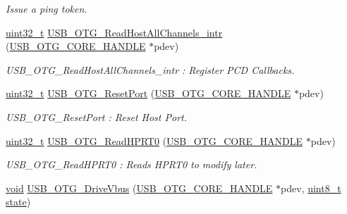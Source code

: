 \begin{DoxyCompactItemize}
\begin{DoxyCompactList}\small\item\em Issue a ping token. \end{DoxyCompactList}\item 
\hyperlink{stdint_8h_a435d1572bf3f880d55459d9805097f62}{uint32\-\_\-t} \hyperlink{group___u_s_b___c_o_r_e___exported___functions_prototype_ga0113e47b0813a1adc74bdc3af7f5eddc}{U\-S\-B\-\_\-\-O\-T\-G\-\_\-\-Read\-Host\-All\-Channels\-\_\-intr} (\hyperlink{group___u_s_b___c_o_r_e___exported___types_gaf76054c11eb8a3367907aad7ae700e80}{U\-S\-B\-\_\-\-O\-T\-G\-\_\-\-C\-O\-R\-E\-\_\-\-H\-A\-N\-D\-L\-E} $\ast$pdev)
\begin{DoxyCompactList}\small\item\em U\-S\-B\-\_\-\-O\-T\-G\-\_\-\-Read\-Host\-All\-Channels\-\_\-intr \-: Register P\-C\-D Callbacks. \end{DoxyCompactList}\item 
\hyperlink{stdint_8h_a435d1572bf3f880d55459d9805097f62}{uint32\-\_\-t} \hyperlink{group___u_s_b___c_o_r_e___exported___functions_prototype_ga5a4de118aadb6d80eaa378c1f2e0450b}{U\-S\-B\-\_\-\-O\-T\-G\-\_\-\-Reset\-Port} (\hyperlink{group___u_s_b___c_o_r_e___exported___types_gaf76054c11eb8a3367907aad7ae700e80}{U\-S\-B\-\_\-\-O\-T\-G\-\_\-\-C\-O\-R\-E\-\_\-\-H\-A\-N\-D\-L\-E} $\ast$pdev)
\begin{DoxyCompactList}\small\item\em U\-S\-B\-\_\-\-O\-T\-G\-\_\-\-Reset\-Port \-: Reset Host Port. \end{DoxyCompactList}\item 
\hyperlink{stdint_8h_a435d1572bf3f880d55459d9805097f62}{uint32\-\_\-t} \hyperlink{group___u_s_b___c_o_r_e___exported___functions_prototype_ga6d0d78bdf0ffcfd2c6230cd4b3f9a776}{U\-S\-B\-\_\-\-O\-T\-G\-\_\-\-Read\-H\-P\-R\-T0} (\hyperlink{group___u_s_b___c_o_r_e___exported___types_gaf76054c11eb8a3367907aad7ae700e80}{U\-S\-B\-\_\-\-O\-T\-G\-\_\-\-C\-O\-R\-E\-\_\-\-H\-A\-N\-D\-L\-E} $\ast$pdev)
\begin{DoxyCompactList}\small\item\em U\-S\-B\-\_\-\-O\-T\-G\-\_\-\-Read\-H\-P\-R\-T0 \-: Reads H\-P\-R\-T0 to modify later. \end{DoxyCompactList}\item 
\hyperlink{group___n_a_m_e_ga18028b8badbf1ea7e704ccac3c488e82}{void} \hyperlink{group___u_s_b___c_o_r_e___exported___functions_prototype_gab72e542f660e9986ccd142913f4474b4}{U\-S\-B\-\_\-\-O\-T\-G\-\_\-\-Drive\-Vbus} (\hyperlink{group___u_s_b___c_o_r_e___exported___types_gaf76054c11eb8a3367907aad7ae700e80}{U\-S\-B\-\_\-\-O\-T\-G\-\_\-\-C\-O\-R\-E\-\_\-\-H\-A\-N\-D\-L\-E} $\ast$pdev, \hyperlink{stdint_8h_aba7bc1797add20fe3efdf37ced1182c5}{uint8\-\_\-t} \hyperlink{posix_2posix_2pios__flashfs__logfs_8c_a13a6109e91ad12705df96a0f2743c630}{state})

\end{DoxyCompactItemize}
